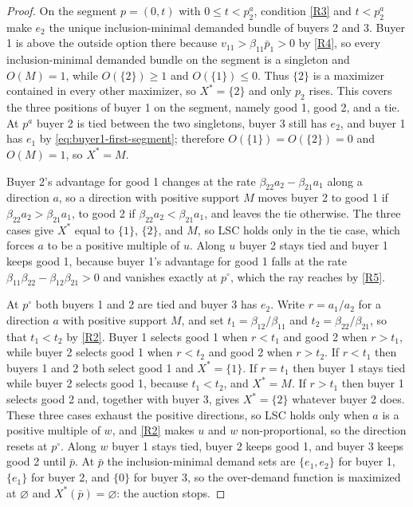\documentclass[11pt,a4paper,fleqn]{article}
\theoremstyle{plain}
\theoremstyle{definition}
\begin{document}
\begin{proof}
On the segment $p=(0,t)$ with $0\le t<p^a_2$, condition \ref{R3} and $t<p^a_2$ make $e_2$ the unique inclusion-minimal demanded bundle of buyers 2 and 3. Buyer 1 is above the outside option there because $v_{11}>\beta_{11}\bar p_1>0$ by \ref{R4}, so every inclusion-minimal demanded bundle on the segment is a singleton and $O(M)=1$, while $O(\{2\})\ge1$ and $O(\{1\})\le0$. Thus $\{2\}$ is a maximizer contained in every other maximizer, so $X^*=\{2\}$ and only $p_2$ rises. This covers the three positions of buyer 1 on the segment, namely good 1, good 2, and a tie. At $p^a$ buyer 2 is tied between the two singletons, buyer 3 still has $e_2$, and buyer 1 has $e_1$ by \eqref{eq:buyer1-first-segment}; therefore $O(\{1\})=O(\{2\})=0$ and $O(M)=1$, so $X^*=M$.

Buyer 2's advantage for good 1 changes at the rate $\beta_{22}a_2-\beta_{21}a_1$ along a direction $a$, so a direction with positive support $M$ moves buyer 2 to good 1 if $\beta_{22}a_2>\beta_{21}a_1$, to good 2 if $\beta_{22}a_2<\beta_{21}a_1$, and leaves the tie otherwise. The three cases give $X^*$ equal to $\{1\}$, $\{2\}$, and $M$, so LSC holds only in the tie case, which forces $a$ to be a positive multiple of $u$. Along $u$ buyer 2 stays tied and buyer 1 keeps good 1, because buyer 1's advantage for good 1 falls at the rate $\beta_{11}\beta_{22}-\beta_{12}\beta_{21}>0$ and vanishes exactly at $p^\circ$, which the ray reaches by \ref{R5}.

At $p^\circ$ both buyers 1 and 2 are tied and buyer 3 has $e_2$. Write $r=a_1/a_2$ for a direction $a$ with positive support $M$, and set $t_1=\beta_{12}/\beta_{11}$ and $t_2=\beta_{22}/\beta_{21}$, so that $t_1<t_2$ by \ref{R2}. Buyer 1 selects good 1 when $r<t_1$ and good 2 when $r>t_1$, while buyer 2 selects good 1 when $r<t_2$ and good 2 when $r>t_2$. If $r<t_1$ then buyers 1 and 2 both select good 1 and $X^*=\{1\}$. If $r=t_1$ then buyer 1 stays tied while buyer 2 selects good 1, because $t_1<t_2$, and $X^*=M$. If $r>t_1$ then buyer 1 selects good 2 and, together with buyer 3, gives $X^*=\{2\}$ whatever buyer 2 does. These three cases exhaust the positive directions, so LSC holds only when $a$ is a positive multiple of $w$, and \ref{R2} makes $u$ and $w$ non-proportional, so the direction resets at $p^\circ$. Along $w$ buyer 1 stays tied, buyer 2 keeps good 1, and buyer 3 keeps good 2 until $\bar p$. At $\bar p$ the inclusion-minimal demand sets are $\{e_1,e_2\}$ for buyer 1, $\{e_1\}$ for buyer 2, and $\{0\}$ for buyer 3, so the over-demand function is maximized at $\varnothing$ and $X^*(\bar p)=\varnothing$: the auction stops.


\end{proof}
\end{document}
